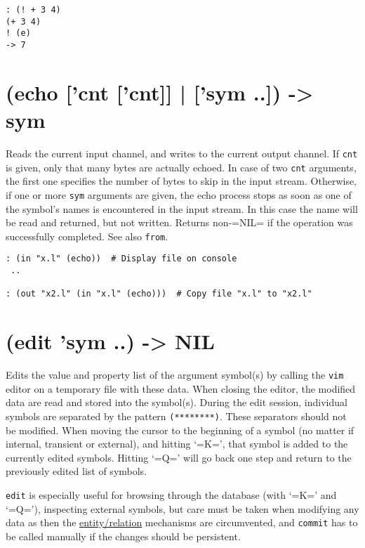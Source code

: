 {{{{{\begin{verbatim}
: (! + 3 4)
(+ 3 4)
! (e)
-> 7
\end{verbatim}

 
\section{(echo ['cnt ['cnt]] | ['sym ..]) -> sym}
\label{sec-8-1-5-5}


Reads the current input channel, and writes to the current output
channel. If \texttt{cnt} is given, only that many bytes are actually echoed. In
case of two \texttt{cnt} arguments, the first one specifies the number of bytes
to skip in the input stream. Otherwise, if one or more \texttt{sym} arguments
are given, the echo process stops as soon as one of the symbol's names
is encountered in the input stream. In this case the name will be read
and returned, but not written. Returns non-=NIL= if the operation was
successfully completed. See also \texttt{from}.


\begin{verbatim}
: (in "x.l" (echo))  # Display file on console
 ..

: (out "x2.l" (in "x.l" (echo)))  # Copy file "x.l" to "x2.l"
\end{verbatim}

 
\section{(edit 'sym ..) -> NIL}
\label{sec-8-1-5-6}


Edits the value and property list of the argument symbol(s) by calling
the \texttt{vim} editor on a temporary file with these data. When closing the
editor, the modified data are read and stored into the symbol(s). During
the edit session, individual symbols are separated by the pattern
\texttt{(********)}. These separators should not be modified. When moving the
cursor to the beginning of a symbol (no matter if internal, transient or
external), and hitting `=K=', that symbol is added to the currently
edited symbols. Hitting `=Q=' will go back one step and return to the
previously edited list of symbols.

\texttt{edit} is especially useful for browsing through the database (with
`=K=' and `=Q='), inspecting external symbols, but care must be taken
when modifying any data as then the \hyperref[ref.html-er]{entity/relation}
mechanisms are circumvented, and \texttt{commit} has to be called manually if
the changes should be persistent.

}}}}}
